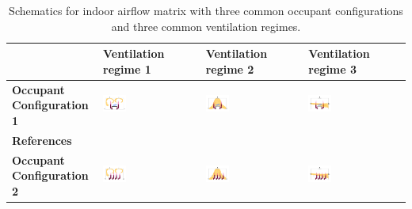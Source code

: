 \documentclass[a4paper,12pt]{elsarticle}
\begin{document}
\begin{table}[ht]
    \caption{Schematics for indoor airflow matrix with three common occupant configurations and three common ventilation regimes.}
    \label{tab:mat}
    \footnotesize
    \centering
    \begin{tabular}{|m{2.5cm}|m{4cm}|m{4cm}|m{4cm}|}
    \hline
     & \textbf{Ventilation regime 1} & \textbf{Ventilation regime 2} & \textbf{Ventilation regime 3} \\
    \hline
    \textbf{Occupant Configuration 1} & \includegraphics[clip,trim={0 2cm 0 2cm},width=0.25\textwidth]{Airflow/mat1.jpeg}& \includegraphics[clip,trim={0 2cm 0 2cm},width=0.25\textwidth]{Airflow/mat4.jpeg}& \includegraphics[clip,trim={0 2cm 0 2cm},width=0.25\textwidth]{Airflow/mat7.jpeg} \\
    \hline
    \textbf{References} & \cite{li2020investigating,zhou2021experimental,pan2022boundary,pan2023predicting,li2022airborne} & \cite{deng2021control,zhou2021experimental,wu2023numerical} & \cite{pendar2020numerical,feng2020influence} \\
    \hline
    \textbf{Occupant Configuration 2} &\includegraphics[clip,trim={0 2cm 0 2cm},width=0.25\textwidth]{Airflow/mat2.jpeg}& \includegraphics[clip,trim={0 2cm 0 2cm},width=0.25\textwidth]{Airflow/mat5.jpeg}& \includegraphics[clip,trim={0 2cm 0 2cm},width=0.25\textwidth]{Airflow/mat8.jpeg} \\

\end{tabular}
\end{table}
\end{document}
